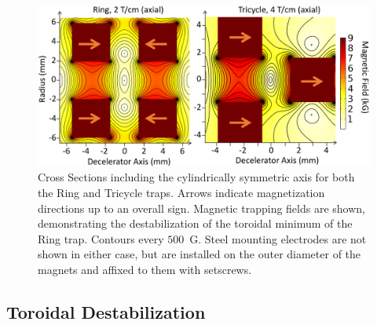 \documentclass[defaultstyle,11pt]{thesis}
\begin{document}
\begin{figure}[t!]
\includegraphics[width=\linewidth]{RingTricycle.png}
\caption[Ring and Tricycle Trap Comparison]{\label{ringtricyclefigure}
Cross Sections including the cylindrically symmetric axis for both the Ring and Tricycle traps. Arrows indicate magnetization directions up to an overall sign. Magnetic trapping fields are shown, demonstrating the destabilization of the toroidal minimum of the Ring trap. Contours every $500$~G. Steel mounting electrodes are not shown in either case, but are installed on the outer diameter of the magnets and affixed to them with setscrews.
}
\end{figure}

\subsection{Toroidal Destabilization}
\end{document}
